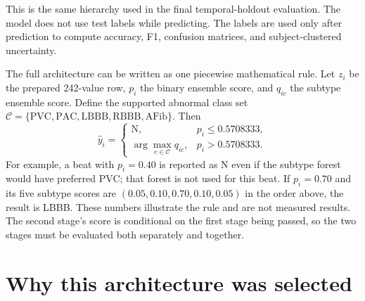 This is the same hierarchy used in the final temporal-holdout evaluation. The
model does not use test labels while predicting. The labels are used only after
prediction to compute accuracy, F1, confusion matrices, and subject-clustered
uncertainty.

The full architecture can be written as one piecewise mathematical rule. Let
$z_i$ be the prepared 242-value row, $p_i$ the binary ensemble score, and
$q_{ic}$ the subtype ensemble score. Define the supported abnormal class set
$\mathcal{C}=\{\mathrm{PVC},\mathrm{PAC},\mathrm{LBBB},\mathrm{RBBB},
\mathrm{AFib}\}$. Then
\begin{equation}
 \widehat y_i=
 \begin{cases}
 \mathrm{N}, & p_i\leq0.5708333,\\[2pt]
 \displaystyle\arg\max_{c\in\mathcal{C}}q_{ic},
 & p_i>0.5708333.
 \end{cases}
 \label{eq:method-complete-decision}
\end{equation}
For example, a beat with $p_i=0.40$ is reported as N even if the subtype
forest would have preferred PVC; that forest is not used for this beat. If
$p_i=0.70$ and its five subtype scores are
$(0.05,0.10,0.70,0.10,0.05)$ in the order above, the result is LBBB.
These numbers illustrate the rule and are not measured results. The second
stage's score is conditional on the first stage being passed, so the two
stages must be evaluated both separately and together.

\section{Why this architecture was selected}

